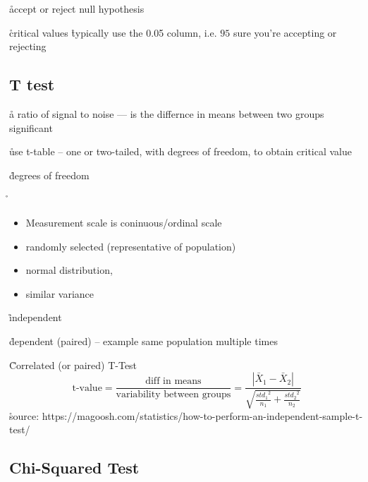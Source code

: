 \r{accept or reject null hypothesis}


\r{critical values \r{typically use the 0.05 column, i.e. $95$ sure you're accepting or rejecting}}

\subsection{T test}



\r{a ratio of signal to noise --- is the differnce in means between two groups significant }

\r{use t-table -- one or two-tailed, with degrees of freedom, to obtain critical value}

\r{degrees of freedom}

\r{\begin{itemize}[noitemsep,topsep=0pt]
		\item Measurement scale is coninuous/ordinal scale
		\item randomly selected (representative of population)
		\item normal distribution,
		\item similar variance
	\end{itemize}
}

\r{independent}

\r{dependent (paired) -- example same population multiple times}


\r{Correlated (or paired) T-Test}
\begin{equation}
	{\textrm{t-value} = \frac{ \textrm{diff in means}}{\textrm{variability between groups}} = \frac{ |\bar{X}_1 - \bar{X}_2|}{ 
			\sqrt{ \frac{ {std_1}^2 }{ n_1 } + \frac{ {std_2}^2 }{ n_2 }}}}
	\label{eq:paired_t_test}
\end{equation}
\r{source: https://magoosh.com/statistics/how-to-perform-an-independent-sample-t-test/}


\subsection{Chi-Squared Test}

